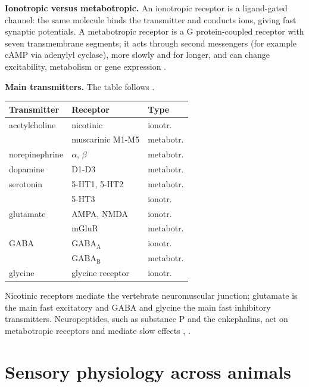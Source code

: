 \textbf{Ionotropic versus metabotropic.}
An ionotropic receptor is a ligand-gated
channel: the same molecule binds the
transmitter and conducts ions, giving
fast synaptic potentials. A metabotropic
receptor is a G protein-coupled receptor
with seven transmembrane segments; it
acts through second messengers (for
example cAMP via adenylyl cyclase), more
slowly and for longer, and can change
excitability, metabolism or gene
expression \cite[Chapter
13]{hill2012animal}.

\textbf{Main transmitters.}
The table follows
\cite[Table 13.2]{hill2012animal}.
\begin{center}
\begin{tabular}{lll}
Transmitter & Receptor & Type \\
\hline
acetylcholine & nicotinic & ionotr. \\
 & muscarinic M1-M5 & metabotr. \\
norepinephrine & $\alpha$, $\beta$
& metabotr. \\
dopamine & D1-D3 & metabotr. \\
serotonin & 5-HT1, 5-HT2
& metabotr. \\
 & 5-HT3 & ionotr. \\
glutamate & AMPA, NMDA & ionotr. \\
 & mGluR & metabotr. \\
GABA & GABA$_{\mathrm{A}}$ & ionotr. \\
 & GABA$_{\mathrm{B}}$ & metabotr. \\
glycine & glycine receptor
& ionotr. \\
\end{tabular}
\end{center}
Nicotinic receptors mediate the
vertebrate neuromuscular junction;
glutamate is the main fast excitatory and
GABA and glycine the main fast inhibitory
transmitters. Neuropeptides, such as
substance P and the enkephalins, act on
metabotropic receptors and mediate slow
effects \cite[Chapter
6]{randall1997eckert}, \cite[Chapter
13]{hill2012animal}.

\section{Sensory physiology across animals}
\label{section-senses}

